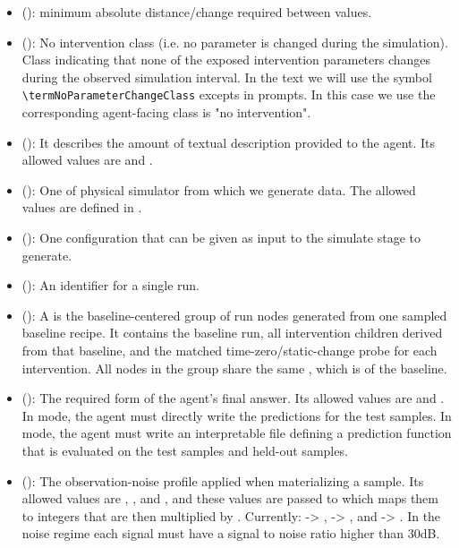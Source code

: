 \documentclass[11pt]{article}
\begin{document}
\begin{itemize}
\item (\termMinAbsDist): minimum absolute distance/change required between values.
\item (\termNoParameterChangeClass): No intervention class (i.e. no parameter is changed during the simulation). 
Class indicating that none of the exposed intervention parameters changes during the observed simulation interval. 
In the text we will use the symbol \verb|\termNoParameterChangeClass| excepts in prompts.
In this case we use the corresponding agent-facing class is "no intervention".
\item (\termDescLevel): It describes the amount of textual description provided to the agent. Its allowed values are  and .
\item (\termSimulator): One of physical simulator from which we generate data. The allowed values are defined in .
\item (\termSimulatorRecipe): One configuration that can be given as input to the simulate stage to generate.
\item (\termRunID): An identifier for a single run. 
\item (\termFamily): A \termFamily is the baseline-centered group of run nodes generated from one sampled baseline recipe. 
It contains the baseline run, all intervention children derived from that baseline, and the matched time-zero/static-change probe for each intervention. 
All nodes in the group share the same , which is \termRunID of the baseline.
\item (\termTaskMode): The required form of the agent's final answer. 
Its allowed values are  and . 
In  mode, the agent must directly write the predictions for the test samples. In  mode, the agent must write an interpretable  file defining a prediction function that is evaluated on the test samples and held-out samples.
\item (\termNoiseLevel): The observation-noise profile applied when materializing a sample.
Its allowed values are , , and , and these values are passed to  which maps them to integers that are then multiplied by .
Currently:  -> ,  -> , and  -> .
In the  noise regime each signal must have a signal to noise ratio higher than 30dB.
\end{itemize}
\end{document}
